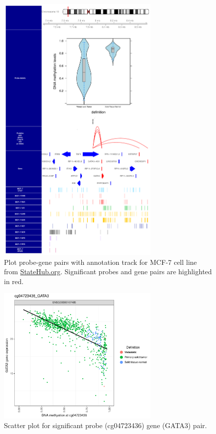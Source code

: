 \begin{figure}[ht!]
\centering
\includegraphics[width=0.7\textwidth]{images/cg04723436_schematic_byProbe.pdf}
\caption[Schematic plot gene-probe pairs]{\label{fig:parplot} Plot probe-gene pairs with annotation track for MCF-7 cell line from \url{StateHub.org}. Significant probes and gene pairs are highlighted in red.}
\end{figure}





\begin{figure}[ht!]
\centering
\includegraphics[width=0.7\textwidth]{images/cg04723436_GATA3_bypair.pdf}
\caption{\label{fig:scatterplot} Scatter plot for significant probe (cg04723436) gene (GATA3) pair.}
\end{figure}

